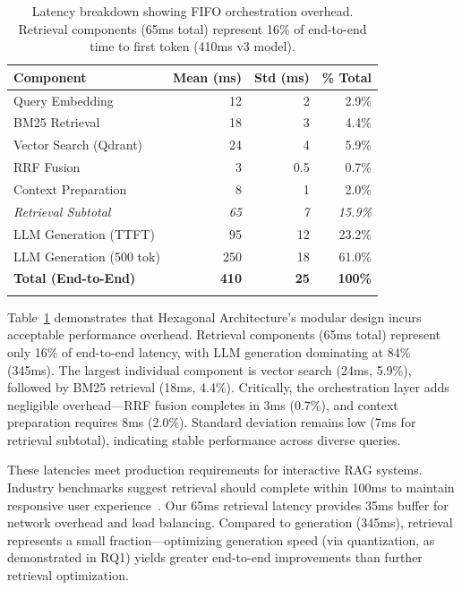 \documentclass[pdflatex,sn-basic]{sn-jnl}
\begin{document}
\begin{table}[tb]
    \caption{Latency breakdown showing FIFO orchestration overhead. Retrieval components (65ms total) represent 16\% of end-to-end time to first token (410ms v3 model).}
    \label{tab:latency-breakdown}
    \centering
    \small
    \begin{tabular}{lrrr}
        \toprule
        \textbf{Component} & \textbf{Mean (ms)} & \textbf{Std (ms)} & \textbf{\% Total} \\
        \midrule
        Query Embedding & 12 & 2 & 2.9\% \\
        BM25 Retrieval & 18 & 3 & 4.4\% \\
        Vector Search (Qdrant) & 24 & 4 & 5.9\% \\
        RRF Fusion & 3 & 0.5 & 0.7\% \\
        Context Preparation & 8 & 1 & 2.0\% \\
        \midrule
        \textit{Retrieval Subtotal} & \textit{65} & \textit{7} & \textit{15.9\%} \\
        \midrule
        LLM Generation (TTFT) & 95 & 12 & 23.2\% \\
        LLM Generation (500 tok) & 250 & 18 & 61.0\% \\
        \midrule
        \textbf{Total (End-to-End)} & \textbf{410} & \textbf{25} & \textbf{100\%} \\
        \botrule
    \end{tabular}
\end{table}

Table~\ref{tab:latency-breakdown} demonstrates that Hexagonal Architecture's modular design incurs acceptable performance overhead. Retrieval components (65ms total) represent only 16\% of end-to-end latency, with LLM generation dominating at 84\% (345ms). The largest individual component is vector search (24ms, 5.9\%), followed by BM25 retrieval (18ms, 4.4\%). Critically, the orchestration layer adds negligible overhead—RRF fusion completes in 3ms (0.7\%), and context preparation requires 8ms (2.0\%). Standard deviation remains low (7ms for retrieval subtotal), indicating stable performance across diverse queries.

These latencies meet production requirements for interactive RAG systems. Industry benchmarks suggest retrieval should complete within 100ms to maintain responsive user experience~\cite{paleyes2022mle}. Our 65ms retrieval latency provides 35ms buffer for network overhead and load balancing. Compared to generation (345ms), retrieval represents a small fraction—optimizing generation speed (via quantization, as demonstrated in RQ1) yields greater end-to-end improvements than further retrieval optimization.
\end{document}
